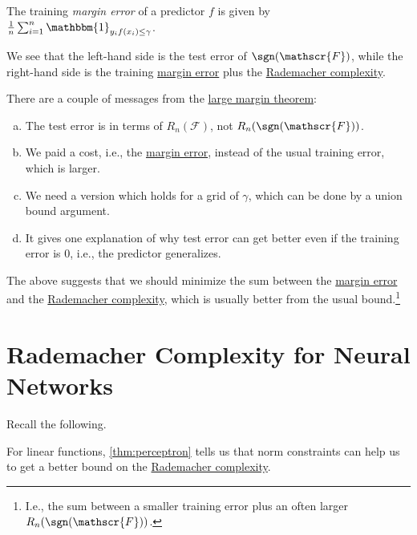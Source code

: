 \begin{notation}\label{not:margin-error}
	The training \emph{margin error} of a predictor \(f\) is given by \(\frac{1}{n} \sum_{i=1}^{n} \mathbbm{1}_{y_i f(x_i) \leq \gamma } \).
\end{notation}

We see that the left-hand side is the test error of \(\sgn (\mathscr{F} )\), while the right-hand side is the training \hyperref[not:margin-error]{margin error} plus the \hyperref[def:Rademacher-complexity]{Rademacher complexity}.

\begin{note}
	There are a couple of messages from the \hyperref[thm:large-margin]{large margin theorem}:
	\begin{enumerate}[(a)]
		\item The test error is in terms of \(R_n(\mathscr{F} )\), not \(R_n(\sgn (\mathscr{F} ))\).
		\item We paid a cost, i.e., the \hyperref[not:margin-error]{margin error}, instead of the usual training error, which is larger.
		\item We need a version which holds for a grid of \(\gamma \), which can be done by a union bound argument.
		\item It gives one explanation of why test error can get better even if the training error is \(0\), i.e., the predictor generalizes.
	\end{enumerate}
\end{note}

\begin{intuition}
	The above suggests that we should minimize the sum between the \hyperref[not:margin-error]{margin error} and the \hyperref[def:Rademacher-complexity]{Rademacher complexity}, which is usually better from the usual bound.\footnote{I.e., the sum between a smaller training error plus an often larger \(R_n(\sgn (\mathscr{F} ))\).}
\end{intuition}

\section{Rademacher Complexity for Neural Networks}
Recall the following.

\begin{prev}
	For linear functions, \autoref{thm:perceptron} tells us that norm constraints can help us to get a better bound on the \hyperref[def:Rademacher-complexity]{Rademacher complexity}.
\end{prev}

